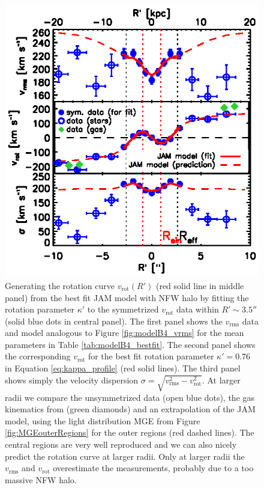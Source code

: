 \documentclass[useAMS,usenatbib]{mnras}
\begin{document}
\begin{figure}
\centering
\includegraphics[width=\linewidth]{B4_rms_rot_curves_best_model.ps}
\caption{Generating the rotation curve $v_\text{rot}(R')$ (red solid line in middle panel) from the best fit JAM model with NFW halo by fitting the rotation parameter $\kappa'$ to the symmetrized $v_\text{rot}$ data within $R'\sim3.5''$ (solid blue dots in central panel). The first panel shows the $v_\text{rms}$ data and model analogous to Figure \ref{fig:modelB4_vrms} for the mean parameters in Table \ref{tab:modelB4_bestfit}. The second panel shows the corresponding $v_\text{rot}$ for the best fit rotation parameter $\kappa' = 0.76$ in Equation \eqref{eq:kappa_profile} (red solid lines). The third panel shows simply the velocity dispersion $\sigma = \sqrt{v_\text{rms}^2 - v_\text{rot}^2}$. At larger radii we compare the unsymmetrized data (open blue dots), the gas kinematics from \citet{SWELLSV} (green diamonds) and an extrapolation of the JAM model, using the light distribution MGE from Figure \ref{fig:MGEouterRegions} for the outer regions (red dashed lines). The central regions are very well reproduced and we can also nicely predict the rotation curve at larger radii. Only at larger radii the $v_\text{rms}$ and $v_\text{rot}$ overestimate the measurements, probably due to a too massive NFW halo.}
\label{fig:modelB4_vrot}
\end{figure}
\end{document}
